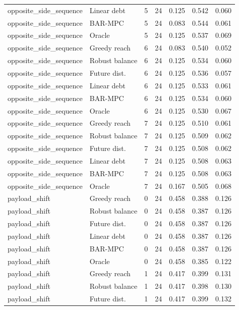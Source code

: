 \begin{longtable}{llrrrrr}
opposite\_side\_sequence & Linear debt & 5 & 24 & 0.125 & 0.542 & 0.060 \\
opposite\_side\_sequence & BAR-MPC & 5 & 24 & 0.083 & 0.544 & 0.061 \\
opposite\_side\_sequence & Oracle & 5 & 24 & 0.125 & 0.537 & 0.069 \\
opposite\_side\_sequence & Greedy reach & 6 & 24 & 0.083 & 0.540 & 0.052 \\
opposite\_side\_sequence & Robust balance & 6 & 24 & 0.125 & 0.534 & 0.060 \\
opposite\_side\_sequence & Future dist. & 6 & 24 & 0.125 & 0.536 & 0.057 \\
opposite\_side\_sequence & Linear debt & 6 & 24 & 0.125 & 0.533 & 0.061 \\
opposite\_side\_sequence & BAR-MPC & 6 & 24 & 0.125 & 0.534 & 0.060 \\
opposite\_side\_sequence & Oracle & 6 & 24 & 0.125 & 0.530 & 0.067 \\
opposite\_side\_sequence & Greedy reach & 7 & 24 & 0.125 & 0.510 & 0.061 \\
opposite\_side\_sequence & Robust balance & 7 & 24 & 0.125 & 0.509 & 0.062 \\
opposite\_side\_sequence & Future dist. & 7 & 24 & 0.125 & 0.508 & 0.062 \\
opposite\_side\_sequence & Linear debt & 7 & 24 & 0.125 & 0.508 & 0.063 \\
opposite\_side\_sequence & BAR-MPC & 7 & 24 & 0.125 & 0.508 & 0.063 \\
opposite\_side\_sequence & Oracle & 7 & 24 & 0.167 & 0.505 & 0.068 \\
payload\_shift & Greedy reach & 0 & 24 & 0.458 & 0.388 & 0.126 \\
payload\_shift & Robust balance & 0 & 24 & 0.458 & 0.387 & 0.126 \\
payload\_shift & Future dist. & 0 & 24 & 0.458 & 0.387 & 0.126 \\
payload\_shift & Linear debt & 0 & 24 & 0.458 & 0.387 & 0.126 \\
payload\_shift & BAR-MPC & 0 & 24 & 0.458 & 0.387 & 0.126 \\
payload\_shift & Oracle & 0 & 24 & 0.458 & 0.385 & 0.122 \\
payload\_shift & Greedy reach & 1 & 24 & 0.417 & 0.399 & 0.131 \\
payload\_shift & Robust balance & 1 & 24 & 0.417 & 0.398 & 0.130 \\
payload\_shift & Future dist. & 1 & 24 & 0.417 & 0.399 & 0.132 \\

\end{longtable}
